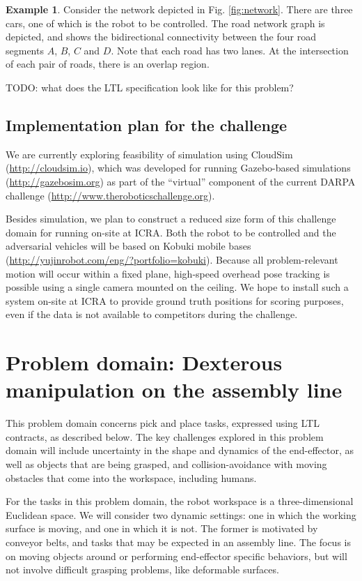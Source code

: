 \documentclass[12pt]{amsart}
\theoremstyle{definition}
\newtheorem{example}{Example}[section]
\begin{document}
\begin{example}
Consider the network depicted in Fig. \ref{fig:network}. There are three cars, one of which is the robot to be controlled. The road network graph is depicted, and shows the bidirectional connectivity between the four road segments $A$, $B$, $C$ and $D$. Note that each road has two lanes. At the intersection of each pair of roads, there is an overlap region.
\end{example}

TODO: what does the LTL specification look like for this problem?

\subsection{Implementation plan for the challenge}

We are currently exploring feasibility of simulation using CloudSim
(\url{http://cloudsim.io}), which was developed for running Gazebo-based
simulations (\url{http://gazebosim.org}) as part of the ``virtual'' component of
the current DARPA challenge (\url{http://www.theroboticschallenge.org}).

Besides simulation, we plan to construct a reduced size form of this challenge
domain for running on-site at ICRA.  Both the robot to be controlled and the
adversarial vehicles will be based on Kobuki mobile bases
(\url{http://yujinrobot.com/eng/?portfolio=kobuki}).  Because all
problem-relevant motion will occur within a fixed plane, high-speed overhead
pose tracking is possible using a single camera mounted on the ceiling.  We hope
to install such a system on-site at ICRA to provide ground truth positions for
scoring purposes, even if the data is not available to competitors during the
challenge.

\section{Problem domain: Dexterous manipulation on the assembly line}\label{sec:dexterousmanip}

This problem domain concerns pick and place tasks, expressed using LTL
contracts, as described below. The key challenges explored in this problem
domain will include uncertainty in the shape and dynamics of the end-effector,
as well as objects that are being grasped, and collision-avoidance with moving
obstacles that come into the workspace, including humans.

For the tasks in this problem domain, the robot workspace is a three-dimensional
Euclidean space. We will consider two dynamic settings: one in which the working
surface is moving, and one in which it is not.  The former is motivated by
conveyor belts, and tasks that may be expected in an assembly line. The focus is
on moving objects around or performing end-effector specific behaviors, but will
not involve difficult grasping problems, like deformable surfaces.
\end{document}

